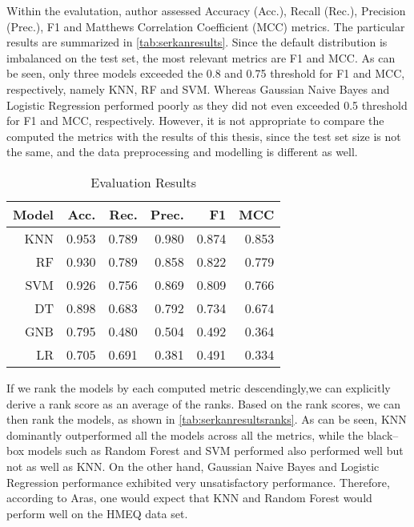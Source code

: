 Within the evalutation, author assessed Accuracy (Acc.), Recall (Rec.), Precision (Prec.), F1 and Matthews Correlation Coefficient (MCC) metrics. The particular results are summarized in \autoref{tab:serkanresults}.
Since the default distribution is imbalanced on the test set, the most relevant metrics are F1 and MCC.
As can be seen, only three models exceeded the 0.8 and 0.75 threshold for F1 and MCC, respectively, namely KNN, RF and SVM. Whereas Gaussian Naive Bayes and Logistic Regression performed poorly as they did not even exceeded 0.5 threshold for F1 and MCC, respectively.
However, it is not appropriate to compare the computed the metrics with the results of this thesis, since the test set size is not the same, and the data preprocessing and modelling is different as well.
\begin{table}[H]
    \small
    \setlength{\tabcolsep}{8pt}
    \renewcommand{\arraystretch}{1.3}
    \centering
    \caption[Evaluation Results \citep{serkan2021bagging}]{Evaluation Results \citep{serkan2021bagging}}\label{tab:serkanresults}
    \begin{tabular}{r r r r r r}
    \toprule
    \textbf{Model} & \textbf{Acc.} & \textbf{Rec.} & \textbf{Prec.} & \textbf{F1} & \textbf{MCC} \\
    \midrule
    \hline
	
	KNN & 0.953 & 0.789 & 0.980 & 0.874 & 0.853 \\
    RF & 0.930 & 0.789 & 0.858 & 0.822 & 0.779 \\
    SVM & 0.926 & 0.756 & 0.869 & 0.809 & 0.766 \\
    DT & 0.898 & 0.683 & 0.792 & 0.734 & 0.674 \\
    GNB & 0.795 & 0.480 & 0.504 & 0.492 & 0.364 \\
	LR & 0.705 & 0.691 & 0.381 & 0.491 & 0.334 \\
	
    \hline
    \bottomrule
    \end{tabular}
    \vspace{0.35em}
    
    \vspace{-1em}
\end{table}

If we rank the models by each computed metric descendingly,we can explicitly derive a rank score as an average of the ranks. Based on the rank scores, we can then rank the models, as shown in \autoref{tab:serkanresultsranks}. As can be seen, KNN dominantly outperformed all the models across all the metrics, while the black--box models such as Random Forest and SVM performed also performed well but not as well as KNN.
On the other hand, Gaussian Naive Bayes and Logistic Regression performance exhibited very unsatisfactory performance.
Therefore, according to Aras, one would expect that KNN and Random Forest would perform well on the HMEQ data set.

